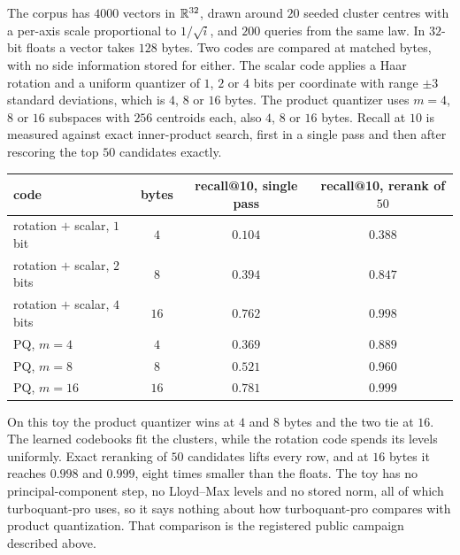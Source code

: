 \begin{example}\label{ex:ch07:e2e}
The corpus has $4000$ vectors in $\mathbb{R}^{32}$, drawn around $20$ seeded cluster centres with a per-axis scale proportional to $1/\sqrt i$, and $200$ queries from the same law. In $32$-bit floats a vector takes $128$ bytes. Two codes are compared at matched bytes, with no side information stored for either. The scalar code applies a Haar rotation and a uniform quantizer of $1$, $2$ or $4$ bits per coordinate with range $\pm3$ standard deviations, which is $4$, $8$ or $16$ bytes. The product quantizer uses $m=4$, $8$ or $16$ subspaces with $256$ centroids each, also $4$, $8$ or $16$ bytes. Recall at $10$ is measured against exact inner-product search, first in a single pass and then after rescoring the top $50$ candidates exactly.

\begin{center}\small
\begin{tabular}{@{}lccc@{}}
\toprule
code & bytes & recall@10, single pass & recall@10, rerank of $50$ \\
\midrule
rotation $+$ scalar, $1$ bit & $4$ & $0.104$ & $0.388$ \\
rotation $+$ scalar, $2$ bits & $8$ & $0.394$ & $0.847$ \\
rotation $+$ scalar, $4$ bits & $16$ & $0.762$ & $0.998$ \\
PQ, $m=4$ & $4$ & $0.369$ & $0.889$ \\
PQ, $m=8$ & $8$ & $0.521$ & $0.960$ \\
PQ, $m=16$ & $16$ & $0.781$ & $0.999$ \\
\bottomrule
\end{tabular}
\end{center}

On this toy the product quantizer wins at $4$ and $8$ bytes and the two tie at $16$. The learned codebooks fit the clusters, while the rotation code spends its levels uniformly. Exact reranking of $50$ candidates lifts every row, and at $16$ bytes it reaches $0.998$ and $0.999$, eight times smaller than the floats. The toy has no principal-component step, no Lloyd--Max levels and no stored norm, all of which turboquant-pro uses, so it says nothing about how turboquant-pro compares with product quantization. That comparison is the registered public campaign described above.
\end{example}

